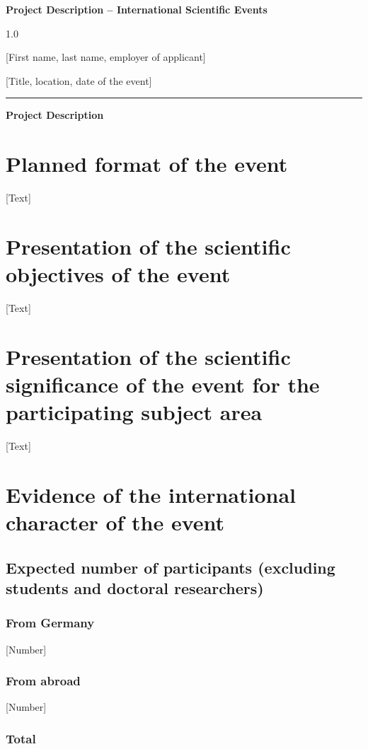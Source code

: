 \documentclass[a4paper,11pt]{article}
\newcommand{\heading}[1]{\textbf{#1}\par\medskip}
\newenvironment{headingblock}{
  \begin{spacing}{1.0}
    \bf
  }{
  \end{spacing}  
}
\newcommand{\horizontalrule}{\rule{\textwidth}{0.4pt}}
\begin{document}
\heading{Project Description -- International Scientific Events}

\begin{headingblock}
  [First name, last name, employer of applicant]

  [Title, location, date of the event]
\end{headingblock}

\horizontalrule

\heading{Project Description}

\section{Planned format of the event}

[Text]

\section{Presentation of the scientific objectives of the event}

[Text]

\section{Presentation of the scientific significance of the event for the participating subject area}

[Text]


\section{Evidence of the international character of the event}

\subsection{Expected number of participants (excluding students and doctoral researchers)}

\subsubsection{From Germany}

[Number]

\subsubsection{From abroad}

[Number]

\subsubsection{Total }
\end{document}

